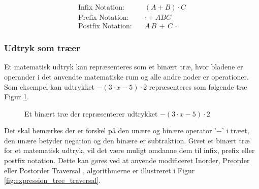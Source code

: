 \begin{align*}
    \text{Infix Notation:} \quad & (A + B) \cdot C \\
    \text{Prefix Notation:} \quad &  \cdot + A B C  \\
    \text{Postfix Notation:} \quad & A \, B \, + \, C \, \cdot
\end{align*}

 

\subsubsection{Udtryk som træer} \label{sec:expression_as_trees}
Et matematisk udtryk kan repræsenteres som et binært træ, hvor bladene er operander i det anvendte matematiske rum og alle andre noder er operationer. Som eksempel kan udtrykket $-(3 \cdot x - 5) \cdot 2$ repræsenteres som følgende træ Figur \ref{fig:expression_tree}. 


\begin{figure}[H]
\centering
{}
\caption{Et binært træ der repræsenterer udtrykket $-(3 \cdot x - 5) \cdot 2$}
\label{fig:expression_tree}
\end{figure}
Det skal bemærkes der er forskel på den unære og binære operator '$-$' i træet, den unære betyder negation og den binære er subtraktion. Givet et binært træ for et matematisk udtryk, vil det være muligt omdanne dem til infix, prefix eller postfix notation. Dette kan gøres ved at anvende modificeret Inorder, Preorder eller Postorder Traversal , algorithmerne er illustreret i Figur \ref{fig:expression_tree_traversal}.



